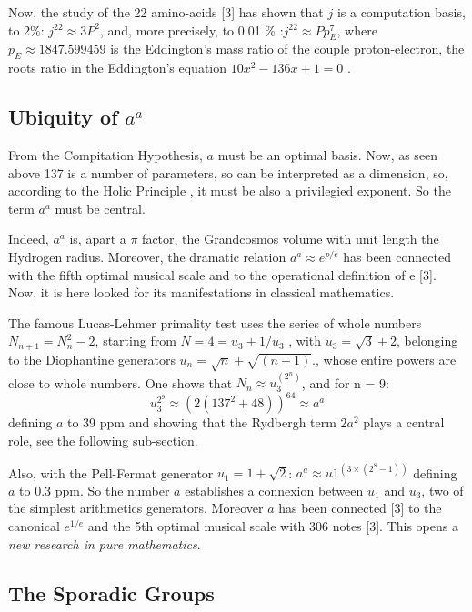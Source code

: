 \documentclass[twoside,draft]{article}
\begin{document}
\begin{sloppypar}
{Now, the study of the 22 amino-acids [3] has shown that $j$ is a computation basis, to 2\%: $j^{22} \approx 3 P^2 $, and, more precisely, to 0.01 \% :$j^{22} \approx Pp_E^7 $, where $ p_E \approx 1847.599459$ is the Eddington's mass ratio of the couple proton-electron, the roots ratio in the Eddington's equation $10x^2 - 136x + 1 = 0 $ .


\subsection{Ubiquity of $a^{a}$}

From the Compitation Hypothesis, $a$ must be an optimal basis. Now, as seen above 137 is a number of parameters, so can be interpreted as a dimension, so, according to the Holic Principle , it must be also a privilegied exponent. So the term $a^a$ must be central.
    
Indeed, $a^a$ is, apart a $\pi$ factor, the Grandcosmos volume with unit length the Hydrogen radius. Moreover, the dramatic relation $a^a\approx e^{p/e}$ has been connected with the fifth optimal musical scale and to the operational definition of e [3]. Now, it is here looked for its manifestations in classical mathematics. 

The famous Lucas-Lehmer primality test uses the series of whole numbers $N_{n+1} = N_{n}^{2}-2$,
starting from $N = 4 = u_{3} + 1/u_{3}$ , with $u_{3} = \sqrt{3} + 2$, belonging to the Diophantine generators $u_{n} = \sqrt{n} + \sqrt{(n+1)}$., whose entire powers are close to whole numbers. One shows that $N_{n} \approx u_{3}^{(2^{n})}$, and for n = 9:
\begin{equation}
u_{3}^{2^9} \approx (2(137^{2} + 48))^{64} \approx a^{a}
\end{equation}
defining $a$ to 39 ppm and showing that the Rydbergh term $2a^2$ plays a central role, see the following sub-section.

Also, with the Pell-Fermat generator $u_{1} = 1 + \sqrt{2}$:
$a^{a} \approx u 1^(3\times(2^{8}-1))$
defining $a$ to 0.3 ppm. So the number $a$ establishes a connexion between $u_{1}$ and $u_{3}$, two of the
simplest arithmetics generators. Moreover $a$ has been connected [3] to the canonical $e^{1/e}$ and the
5th optimal musical scale with 306 notes [3]. This opens a \textit{new research in pure mathematics}.

\subsection{The Sporadic Groups}

}
\end{sloppypar}
\end{document}
